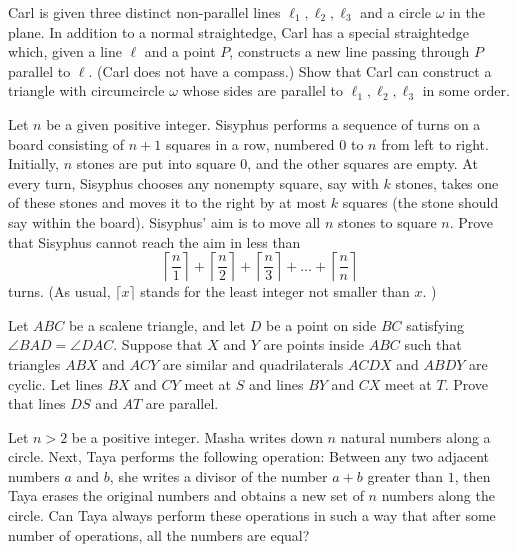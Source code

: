 \documentclass[11pt]{scrartcl}
\begin{document}
\begin{problem}[6306108494297192985]
Carl is given three distinct non-parallel lines $\ell_1, \ell_2, \ell_3$ and a circle $\omega$ in the plane. In addition to a normal straightedge, Carl has a special straightedge which, given a line $\ell$ and a point $P$, constructs a new line passing through $P$ parallel to $\ell$. (Carl does not have a compass.) Show that Carl can construct a triangle with circumcircle $\omega$ whose sides are parallel to $\ell_1,\ell_2,\ell_3$ in some order.
\end{problem}
\begin{problem}[8670333331361701457]
	Let $n$ be a given positive integer. Sisyphus performs a sequence of turns on a board consisting of $n + 1$ squares in a row, numbered $0$ to $n$ from left to right. Initially, $n$ stones are put into square $0$, and the other squares are empty. At every turn, Sisyphus chooses any nonempty square, say with $k$ stones, takes one of these stones and moves it to the right by at most $k$ squares (the stone should say within the board). Sisyphus' aim is to move all $n$ stones to square $n$.
Prove that Sisyphus cannot reach the aim in less than
\[ \left \lceil \frac{n}{1} \right \rceil + \left \lceil \frac{n}{2} \right \rceil + \left \lceil \frac{n}{3} \right \rceil + \dots + \left \lceil \frac{n}{n} \right \rceil \]turns. (As usual, $\lceil x \rceil$ stands for the least integer not smaller than $x$. )
\end{problem}
\begin{problem}[736821043753990]
Let $ABC$ be a scalene triangle, and let $D$ be a point on side $BC$ satisfying $\angle BAD=\angle DAC$. Suppose that $X$ and $Y$ are points inside $ABC$ such that triangles $ABX$ and $ACY$ are similar and quadrilaterals $ACDX$ and $ABDY$ are cyclic. Let lines $BX$ and $CY$ meet at $S$ and lines $BY$ and $CX$ meet at $T$. Prove that lines $DS$ and $AT$ are parallel.
\end{problem}
\begin{problem}[989812634983805]
Let $n>2$ be a positive integer. Masha writes down $n$ natural numbers along a circle. Next, Taya performs the following operation: Between any two adjacent numbers $a$ and $b$, she writes a divisor of the number $a+b$ greater than $1$, then Taya erases the original numbers and obtains a new set of $n$ numbers along the circle. Can Taya always perform these operations in such a way that after some number of operations, all the numbers are equal?
\end{problem}
\end{document}
